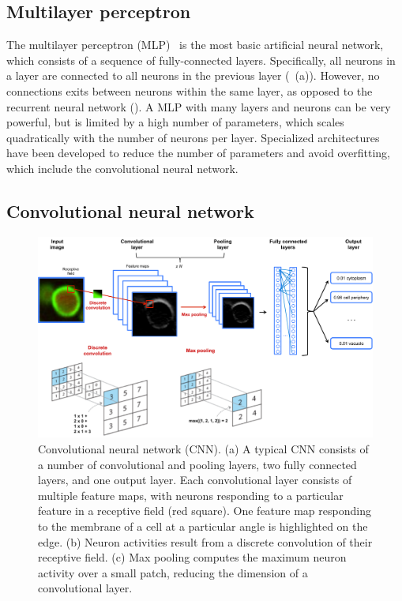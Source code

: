 \subsection{Multilayer perceptron}

The multilayer perceptron (MLP)~\citep{rosenblatt_perceptron:_1958} is the most basic artificial neural network, which consists of a sequence of fully-connected layers. Specifically, all neurons in a layer are connected to all neurons in the previous layer (~(a)). However, no connections exits between neurons within the same layer, as opposed to the recurrent neural network (). A MLP with many layers and neurons can be very powerful, but is limited by a high number of parameters, which scales quadratically with the number of neurons per layer. Specialized architectures have been developed to reduce the number of parameters and avoid overfitting, which include the convolutional neural network.


\subsection{Convolutional neural network} \label{sec:dl_cnn}

\begin{figure}[htbp!]
\centering
\includegraphics[width=1.0\textwidth]{cnn}
\caption[Convolutional neural network (CNN).]{Convolutional neural network (CNN). (a) A typical CNN consists of a number of convolutional and pooling layers, two fully connected layers, and one output layer. Each convolutional layer consists of multiple feature maps, with neurons responding to a particular feature in a receptive field (red square). One feature map responding to the membrane of a cell at a particular angle is highlighted on the edge. (b) Neuron activities result from a discrete convolution of their receptive field. (c) Max pooling computes the maximum neuron activity over a small patch, reducing the dimension of a convolutional layer.}
\label{fig:dl_cnn}
\end{figure}


